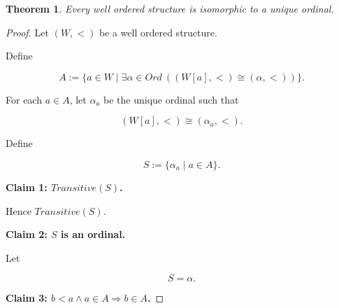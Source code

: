 \documentclass[10pt,a4paper]{book}
\newtheorem{theorem}{Theorem}[section]
\begin{document}
\begin{theorem}
    Every well ordered structure is isomorphic to a unique ordinal.
\end{theorem}

\begin{proof}

    Let $(W,<)$ be a well ordered structure.

    Define

    \[
        A:=\{a\in W\mid \exists \alpha\in Ord\ ((W[a],<)\cong (\alpha,<))\}.
    \]

    For each $a\in A$, let $\alpha_a$ be the unique ordinal such that

    \[
        (W[a],<)\cong (\alpha_a,<).
    \]

    Define

    \[
        S:=\{\alpha_a\mid a\in A\}.
    \]

    \textbf{Claim 1: $Transitive(S)$.}

    \begin{fitchproof}[arrayenv=tabular]

         
         
         

    \end{fitchproof}

    Hence $Transitive(S)$.

    \medskip

    \textbf{Claim 2: $S$ is an ordinal.}

    \begin{fitchproof}[arrayenv=tabular]

         
         
         
         

    \end{fitchproof}

    Let

    \[
        S=\alpha.
    \]

    \medskip

    \textbf{Claim 3: $b<a\land a\in A \Rightarrow b\in A$.}


\end{proof}
\end{document}

